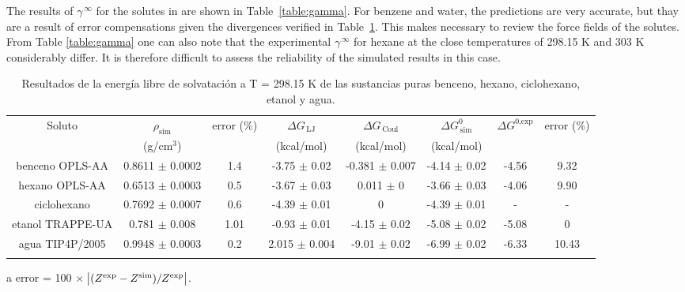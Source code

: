 \documentclass[3p,twocolumn]{elsarticle}
\begin{document}
The results of $\gamma^{\, \infty}$ for the solutes in \ce{[emim][B(CN)_4]} are shown in Table~\ref{table:gamma}. For benzene and water, the predictions are very accurate, but thay are a result of error compensations given the divergences verified in Table~\ref{table:mu_solutos}. This makes necessary to review the force fields of the solutes. From Table \ref{table:gamma} one can also note that the experimental $\gamma^{\, \infty}$ for hexane at the close temperatures of 298.15 K and 303 K considerably differ. It is therefore difficult to assess the reliability of the simulated results in this case.

\begin{table}
\centering
\begin{adjustbox}{width=1\textwidth}
\begin{threeparttable}
\caption{Resultados de la energía libre de solvatación a T = 298.15 K de las sustancias puras benceno, hexano, ciclohexano, etanol y agua.}
\begin{tabular}{ c c c c c c c c }
\toprule
Soluto & $\rho_{\text{sim}}$ & error (\%)\tnote{a} & $\Delta G_{\,\text{LJ}}$  & $\Delta G_{\,\text{Coul}}$  & $\Delta G^{0}_{\,\text{sim}}$ & $\Delta G^{\text{0,exp}}$   & error (\%)\tnote{a}\\
 & (g/cm$^{3}$) &  & (kcal/mol) &  (kcal/mol) &  (kcal/mol)   &  \\
\hline
benceno OPLS-AA   & 0.8611 $\pm$ 0.0002 & 1.4 & -3.75  $\pm$ 0.02 & -0.381 $\pm$ 0.007 & -4.14 $\pm$ 0.02 & -4.56 & 9.32  \\
hexano OPLS-AA    & 0.6513 $\pm$ 0.0003 & 0.5 & -3.67  $\pm$  0.03 & 0.011 $\pm$ 0 & -3.66 $\pm$ 0.03 & -4.06 & 9.90 \\
ciclohexano & 0.7692 $\pm$ 0.0007 & 0.6 & -4.39 $\pm$ 0.01 & 0 & -4.39 $\pm$ 0.01 & - & -  \\
etanol TRAPPE-UA   & 0.781 $\pm$ 0.008 & 1.01  &-0.93 $\pm$ 0.01 & -4.15 $\pm$ 0.02  & -5.08  $\pm$ 0.02  & -5.08 & 0 \\
agua TIP4P/2005   &  0.9948 $\pm$ 0.0003 & 0.2 & 2.015 $\pm$ 0.004 & -9.01 $\pm$ 0.02 & -6.99 $\pm$ 0.02 & -6.33  &10.43 \\
 \bottomrule
\label{table:mu_solutos} 
\end{tabular}
\begin{tablenotes}
\item[a] error = 100 $\times$ $\abs{(Z^{\text{exp}} - Z^{\text{sim}})/Z^{\text{exp}}}$.
\end{tablenotes}
\end{threeparttable}
\end{adjustbox}
\end{table}
\end{document}
